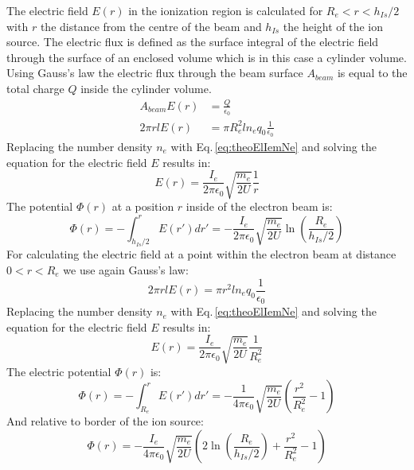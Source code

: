 		The electric field $E(r)$ in the ionization region is calculated for $R_e<r<h_{Is}/2$ with $r$ the distance from the centre of the beam and $h_{Is}$ the height of the ion source. The electric flux is defined as the surface integral of the electric field through the surface of an enclosed volume which is in this case a cylinder volume. Using Gauss's law the electric flux through the beam surface $A_{beam}$ is equal to the total charge $Q$ inside the cylinder volume.
		\begin{align}
			A_{beam} E(r) &= \frac{Q}{\epsilon_0}\\
			2\pi r l E(r) &= \pi R_e^2 l n_e q_0 \frac{1}{\epsilon_0}
		\end{align}
		Replacing the number density $n_e$ with Eq.\,\eqref{eq:theoElIemNe} and solving the equation for the electric field $E$ results in:
		\begin{equation}
			E(r) = \frac{I_e}{2 \pi \epsilon_0} \sqrt{\frac{m_e}{2U}}\frac{1}{r}
		\end{equation}
		The potential $\Phi (r)$ at a position $r$ inside of the electron beam is:
		\begin{equation}
			\Phi (r) = -\int_{h_{Is}/2}^{r} E(r') dr' = -\frac{I_e}{2\pi\epsilon_0}\sqrt{\frac{m_e}{2U}}\ln\left(\frac{R_e}{h_{Is}/2}\right)
		\end{equation}
		For calculating the electric field at a point within the electron beam at distance $0<r<R_e$ we use again Gauss's law:
		\begin{equation}
			2\pi r l E(r) = \pi r^2 l n_e q_0 \frac{1}{\epsilon_0}
		\end{equation}
		Replacing the number density $n_e$ with Eq.\,\eqref{eq:theoElIemNe} and solving the equation for the electric field $E$ results in:
		\begin{equation}
			E(r) = \frac{I_e}{2\pi\epsilon_0}\sqrt{\frac{m_e}{2U}}\frac{1}{R_e^2}
		\end{equation}
		The electric potential $\Phi (r)$ is:
		\begin{equation}
			\Phi (r) = -\int_{R_e}^{r} E(r') dr' = -\frac{1}{4\pi\epsilon_0}\sqrt{\frac{m_e}{2U}}\left(\frac{r^2}{R_e^2} -1 \right)
		\end{equation}
		And relative to border of the ion source:
		\begin{equation}
			\Phi(r) = -\frac{I_e}{4\pi\epsilon_0}\sqrt{\frac{m_e}{2U}}\left(2\ln\left(\frac{R_e}{h_{Is}/2}\right) +\frac{r^2}{R_e^2} -1 \right)
			\label{eq:elPotIem}
		\end{equation}
	
